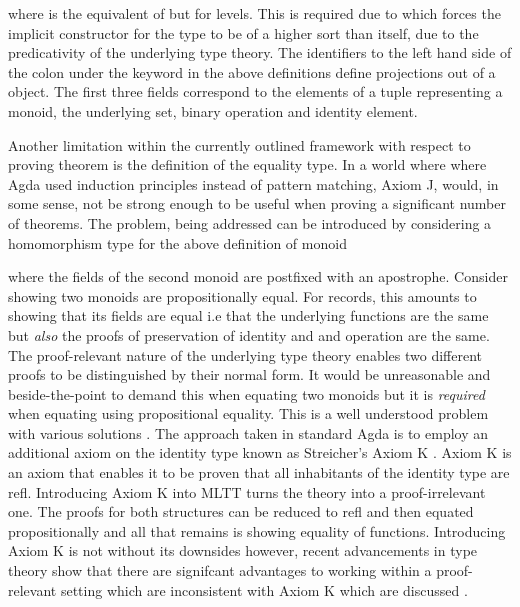 where  is the equivalent of  but for
levels. This is required due to \AgdaField{$\bullet$} which
forces the implicit constructor for the type to be of a higher sort than
 itself, due to the predicativity of the underlying type theory.
The identifiers to the left hand side of the colon under the 
keyword in the above definitions define projections out of a
 object. The first three fields correspond to the elements
of a tuple representing a monoid, the underlying set, binary operation and
identity element.

Another limitation within the currently outlined framework with respect to
proving theorem is the definition of the equality type. In a world where where
Agda used induction principles instead of pattern matching, \textsf{Axiom J},
would, in some sense, not be strong enough to be useful when proving a
significant number of theorems. The problem, being addressed can be introduced
by considering a homomorphism type for the above definition of monoid

\begin{AgdaMultiCode}
\end{AgdaMultiCode}

where the fields of the second monoid are postfixed with an apostrophe. Consider
showing two monoids are propositionally equal. For records, this amounts to
showing that its fields are equal i.e that the underlying functions are the
same but \textit{also} the proofs of preservation of identity and and operation
are the same. The proof-relevant nature of the underlying type theory enables
two different proofs to be distinguished by their normal form. It would be
unreasonable and beside-the-point to demand this when equating two monoids but
it is \textit{required} when equating using propositional equality. This is a
well understood problem with various solutions . The
approach taken in standard Agda is to employ an additional axiom on the identity
type known as Streicher's \textsf{Axiom K} \cite{streicher1993investigations}.
\textsf{Axiom K} is an axiom that enables it to be proven that all inhabitants
of the identity type are \textsf{refl}. Introducing \textsf{Axiom K} into MLTT
turns the theory into a proof-irrelevant one. The proofs for both structures
can be reduced to refl and then equated propositionally and all that remains is
showing equality of functions. Introducing \textsf{Axiom K} is not without its
downsides however, recent advancements in type theory \cite{hottbook}
show that there are signifcant advantages to working within a proof-relevant
setting which are inconsistent with \textsf{Axiom K} which are discussed
.

